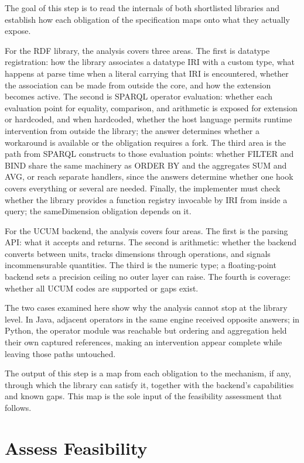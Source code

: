 The goal of this step is to read the internals of both shortlisted libraries and establish how each obligation of the specification maps onto what they actually expose.

For the RDF library, the analysis covers three areas. The first is datatype registration: how the library associates a datatype IRI with a custom type, what happens at parse time when a literal carrying that IRI is encountered, whether the association can be made from outside the core, and how the extension becomes active. The second is SPARQL operator evaluation: whether each evaluation point for equality, comparison, and arithmetic is exposed for extension or hardcoded, and when hardcoded, whether the host language permits runtime intervention from outside the library; the answer determines whether a workaround is available or the obligation requires a fork. The third area is the path from SPARQL constructs to those evaluation points: whether FILTER and BIND share the same machinery as ORDER BY and the aggregates SUM and AVG, or reach separate handlers, since the answers determine whether one hook covers everything or several are needed. Finally, the implementer must check whether the library provides a function registry invocable by IRI from inside a query; the sameDimension obligation depends on it.

For the UCUM backend, the analysis covers four areas. The first is the parsing API: what it accepts and returns. The second is arithmetic: whether the backend converts between units, tracks dimensions through operations, and signals incommensurable quantities. The third is the numeric type; a floating-point backend sets a precision ceiling no outer layer can raise. The fourth is coverage: whether all UCUM codes are supported or gaps exist.

The two cases examined here show why the analysis cannot stop at the library level. In Java, adjacent operators in the same engine received opposite answers; in Python, the operator module was reachable but ordering and aggregation held their own captured references, making an intervention appear complete while leaving those paths untouched.

The output of this step is a map from each obligation to the mechanism, if any, through which the library can satisfy it, together with the backend's capabilities and known gaps. This map is the sole input of the feasibility assessment that follows.

\section{Assess Feasibility}

